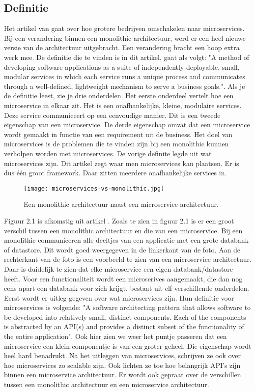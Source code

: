 \subsection{Definitie}
Het artikel van \textcite{Mauersberger2017} gaat over hoe grotere bedrijven omschakelen naar microservices. Bij een verandering binnen een monolithic architectuur, werd er een heel nieuwe versie van de architectuur uitgebracht. Een verandering bracht een hoop extra werk mee. De definitie die te vinden is in dit artikel, gaat als volgt: "A method of developing software applications as a suite of independently deployable, small, modular services in which each service runs a unique process and communicates through a well-defined, lightweight mechanism to serve a business goals.". Als je de definitie leest, zie je drie onderdelen. Het eerste onderdeel vertelt hoe een microservice in elkaar zit. Het is een onafhankelijke, kleine, modulaire services. Deze service communiceert op een eenvoudige manier. Dit is een tweede eigenschap van een microservice. De derde eigenschap omvat dat een microservice wordt gemaakt in functie van een requirement uit de business. Het doel van microservices is de problemen die te vinden zijn bij een monolithic kunnen verholpen worden met microservices. De vorige definite legde uit wat microservices zijn. Dit artikel zegt waar men microservices kan plaatsen. Er is dus één groot framework. Daar zitten meerdere onafhankelijke services in.
\begin{figure}[h]
	\texttt{[image: microservices-vs-monolithic.jpg]}
	\centering
	\caption{Een monolithic architectuur naast een microservice architectuur.}
\end{figure}
Figuur 2.1 is afkomstig uit artikel \textcite{Watts2018}.
Zoals te zien in figuur 2.1 is er een groot verschil tussen een monolithic architectuur en die van een microservice. Bij een monolithic communiceren alle deeltjes van een applicatie met een grote databank of datastore. Dit wordt goed weergegeven in de linkerkant van de foto. Aan de rechterkant van de foto is een voorbeeld te zien van een microservice architectuur. Daar is duidelijk te zien dat elke microservice een eigen databank/datastore heeft. Voor een functionaliteit wordt een microserives aangemaakt, die dan nog eens apart een databank voor zich krijgt. 
\textcite{series2018} bestaat uit elf verschillende onderdelen. Eerst wordt er uitleg gegeven over wat microservices zijn. Hun definitie voor microservices is volgende: "A software architecting pattern that allows software to be developed into relatively small, distinct components. Each of the components is abstracted by an API(s) and provides a distinct subset of the functionality of the entire application". Ook hier zien we weer het puntje passeren dat een microservice een klein componentje is van een groter geheel. Die eigenschap wordt heel hard benadrukt. Na het uitleggen van microservices, schrijven ze ook over hoe microservices zo scalable zijn. Ook lichten ze toe hoe belangrijk API's zijn binnen een microservice architectuur. Er wordt ook gepraat over de verschillen tussen een monolithic architectuur en een microservice architectuur. 
